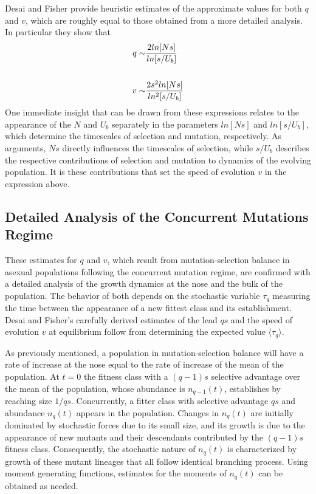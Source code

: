 \documentclass[12pt]{article}
\begin{document}
Desai and Fisher provide heuristic estimates of the approximate values for both $q$ and $v$, which are roughly equal to those obtained from a more detailed analysis.  In particular they show that
\begin{equation}
\begin{aligned}
q \sim & {2ln[Ns] \over ln[s/U_b]} \\   
\\
v \sim & {2s^2ln[Ns] \over ln^2[s/U_b]}
\end{aligned}
\end{equation}
One immediate insight that can be drawn from these expressions relates to the appearance of the $N$ and $U_b$ separately in the parameters $ln[Ns]$ and $ln[s/U_b]$, which determine the timescales of selection and mutation, respectively.  As arguments, $Ns$ directly influences the timescales of selection, while $s/U_b$ describes the respective contributions of selection and mutation to dynamics of the evolving population.  It is these contributions that set the speed of evolution $v$ in the expression above.   

\subsection*{Detailed Analysis of the Concurrent Mutations Regime}
These estimates for $q$ and $v$, which result from mutation-selection balance in asexual populations following the concurrent mutation regime, are confirmed with a detailed analysis of the growth dynamics at the nose and the bulk of the population.  The behavior of both depends on the stochastic variable $\tau_q$ measuring the time between the appearance of a new fittest class and its establishment.  Desai and Fisher's carefully derived estimates of the lead $qs$ and the speed of evolution $v$ at equilibrium follow from determining the expected value $\langle \tau_q \rangle$.   

As previously mentioned, a population in mutation-selection balance will have a rate of increase at the nose equal to the rate of increase of the mean of the population.  At $t=0$ the fitness class with a $(q-1)s$ selective advantage over the mean of the population, whose abundance is $n_{q-1}(t)$, establishes by reaching size $1/qs$.  Concurrently, a fitter class with selective advantage $qs$ and abundance $n_q(t)$ appears in the population.  Changes in $n_q(t)$ are initially dominated by stochastic forces due to its small size, and its growth is due to the appearance of new mutants and their descendants contributed by the $(q-1)s$ fitness class. Consequently, the stochastic nature of $n_q(t)$ is characterized by growth of these mutant lineages that all follow identical branching process.  Using moment generating functions, estimates for the moments of $n_q(t)$ can be obtained as needed.
\end{document}
